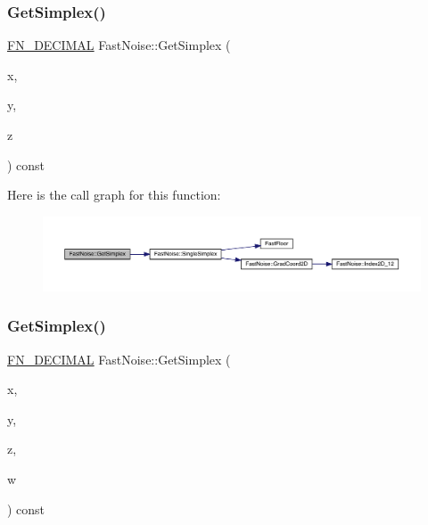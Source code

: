 \subsubsection{\texorpdfstring{Get\+Simplex()}{GetSimplex()}\hspace{0.1cm}{\footnotesize\ttfamily [2/3]}}
{\footnotesize\ttfamily \mbox{\hyperlink{_fast_noise_8h_a75a9ef6d2541c4921815b885bfd449c3}{F\+N\+\_\+\+D\+E\+C\+I\+M\+AL}} Fast\+Noise\+::\+Get\+Simplex (\begin{DoxyParamCaption}\item[{\mbox{\hyperlink{_fast_noise_8h_a75a9ef6d2541c4921815b885bfd449c3}{F\+N\+\_\+\+D\+E\+C\+I\+M\+AL}}}]{x,  }\item[{\mbox{\hyperlink{_fast_noise_8h_a75a9ef6d2541c4921815b885bfd449c3}{F\+N\+\_\+\+D\+E\+C\+I\+M\+AL}}}]{y,  }\item[{\mbox{\hyperlink{_fast_noise_8h_a75a9ef6d2541c4921815b885bfd449c3}{F\+N\+\_\+\+D\+E\+C\+I\+M\+AL}}}]{z }\end{DoxyParamCaption}) const}

Here is the call graph for this function\+:
\nopagebreak
\begin{figure}[H]
\begin{center}
\leavevmode
\includegraphics[width=350pt]{class_fast_noise_a4ab5e306f72c428fef0e69be3166c07d_cgraph}
\end{center}
\end{figure}
\mbox{\label{class_fast_noise_a699fc06c0d6abe30627c2131606b6bfa}} 
\subsubsection{\texorpdfstring{Get\+Simplex()}{GetSimplex()}\hspace{0.1cm}{\footnotesize\ttfamily [3/3]}}
{\footnotesize\ttfamily \mbox{\hyperlink{_fast_noise_8h_a75a9ef6d2541c4921815b885bfd449c3}{F\+N\+\_\+\+D\+E\+C\+I\+M\+AL}} Fast\+Noise\+::\+Get\+Simplex (\begin{DoxyParamCaption}\item[{\mbox{\hyperlink{_fast_noise_8h_a75a9ef6d2541c4921815b885bfd449c3}{F\+N\+\_\+\+D\+E\+C\+I\+M\+AL}}}]{x,  }\item[{\mbox{\hyperlink{_fast_noise_8h_a75a9ef6d2541c4921815b885bfd449c3}{F\+N\+\_\+\+D\+E\+C\+I\+M\+AL}}}]{y,  }\item[{\mbox{\hyperlink{_fast_noise_8h_a75a9ef6d2541c4921815b885bfd449c3}{F\+N\+\_\+\+D\+E\+C\+I\+M\+AL}}}]{z,  }\item[{\mbox{\hyperlink{_fast_noise_8h_a75a9ef6d2541c4921815b885bfd449c3}{F\+N\+\_\+\+D\+E\+C\+I\+M\+AL}}}]{w }\end{DoxyParamCaption}) const}

